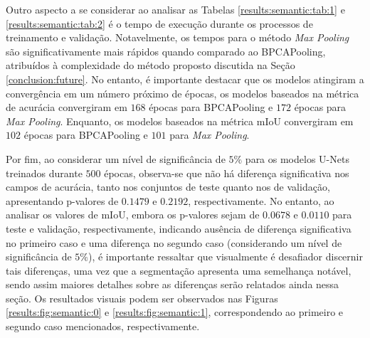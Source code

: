 Outro aspecto a se considerar ao analisar as Tabelas \ref{results:semantic:tab:1} e \ref{results:semantic:tab:2} é o tempo de execução durante os processos de treinamento e validação. Notavelmente, os tempos para o método \textit{Max Pooling} são significativamente mais rápidos quando comparado ao BPCAPooling, atribuídos à complexidade do método proposto discutida na Seção \ref{conclusion:future}. No entanto, é importante destacar que os modelos atingiram a convergência em um número próximo de épocas, os modelos baseados na métrica de acurácia convergiram em $168$ épocas para BPCAPooling e $172$ épocas para \textit{Max Pooling}. Enquanto, os modelos baseados na métrica mIoU convergiram em $102$ épocas para BPCAPooling e $101$ para \textit{Max Pooling}.

Por fim, ao considerar um nível de significância de $5\%$ para os modelos U-Nets treinados durante $500$ épocas, observa-se que não há diferença significativa nos campos de acurácia, tanto nos conjuntos de teste quanto nos de validação, apresentando p-valores de $0.1479$ e $0.2192$, respectivamente. No entanto, ao analisar os valores de mIoU, embora os p-valores sejam de $0.0678$ e $0.0110$ para teste e validação, respectivamente, indicando ausência de diferença significativa no primeiro caso e uma diferença no segundo caso (considerando um nível de significância de $5\%$), é importante ressaltar que visualmente é desafiador discernir tais diferenças, uma vez que a segmentação apresenta uma semelhança notável, sendo assim maiores detalhes sobre as diferenças serão relatados ainda nessa seção. Os resultados visuais podem ser observados nas Figuras \ref{results:fig:semantic:0} e \ref{results:fig:semantic:1}, correspondendo ao primeiro e segundo caso mencionados, respectivamente.

